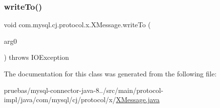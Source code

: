 \subsubsection{\texorpdfstring{write\+To()}{writeTo()}\hspace{0.1cm}{\footnotesize\ttfamily [2/2]}}
{\footnotesize\ttfamily void com.\+mysql.\+cj.\+protocol.\+x.\+X\+Message.\+write\+To (\begin{DoxyParamCaption}\item[{Output\+Stream}]{arg0 }\end{DoxyParamCaption}) throws I\+O\+Exception}



The documentation for this class was generated from the following file\+:\begin{DoxyCompactItemize}
\item 
pruebas/mysql-\/connector-\/java-\/8../src/main/protocol-\/impl/java/com/mysql/cj/protocol/x/\mbox{\hyperlink{_x_message_8java}{X\+Message.\+java}}\end{DoxyCompactItemize}
